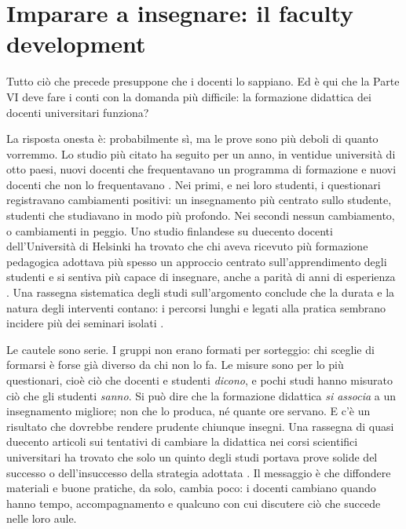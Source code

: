 \section{Imparare a insegnare: il faculty development}

Tutto ciò che precede presuppone che i docenti lo sappiano. Ed è qui
che la Parte VI deve fare i conti con la domanda più difficile: la
formazione didattica dei docenti universitari funziona?

La risposta onesta è: probabilmente sì, ma le prove sono più deboli di
quanto vorremmo. Lo studio più citato ha seguito per un anno, in
ventidue università di otto paesi, nuovi docenti che frequentavano un
programma di formazione e nuovi docenti che non lo frequentavano
\parencite{gibbs2004}. Nei primi, e nei loro studenti, i questionari
registravano cambiamenti positivi: un insegnamento più centrato sullo
studente, studenti che studiavano in modo più profondo. Nei secondi
nessun cambiamento, o cambiamenti in peggio. Uno studio finlandese su
duecento docenti dell'Università di Helsinki ha trovato che chi aveva
ricevuto più formazione pedagogica adottava più spesso un approccio
centrato sull'apprendimento degli studenti e si sentiva più capace di
insegnare, anche a parità di anni di esperienza \parencite{postareff2007}.
Una rassegna sistematica degli studi sull'argomento conclude che la
durata e la natura degli interventi contano: i percorsi lunghi e
legati alla pratica sembrano incidere più dei seminari isolati
\parencite{stes2010}.

Le cautele sono serie. I gruppi non erano formati per sorteggio: chi
sceglie di formarsi è forse già diverso da chi non lo fa. Le misure
sono per lo più questionari, cioè ciò che docenti e studenti
\emph{dicono}, e pochi studi hanno misurato ciò che gli studenti
\emph{sanno}. Si può dire che la formazione didattica \emph{si associa}
a un insegnamento migliore; non che lo produca, né quante ore servano.
E c'è un risultato che dovrebbe rendere prudente chiunque
insegni. Una
rassegna di quasi duecento articoli sui tentativi di cambiare la
didattica nei corsi scientifici universitari ha trovato che solo un
quinto degli studi portava prove solide del successo o dell'insuccesso
della strategia adottata \parencite{henderson2011}. Il messaggio è
che diffondere materiali e buone pratiche, da solo, cambia poco: i
docenti cambiano quando hanno tempo, accompagnamento e qualcuno con
cui discutere ciò che succede nelle loro aule.

